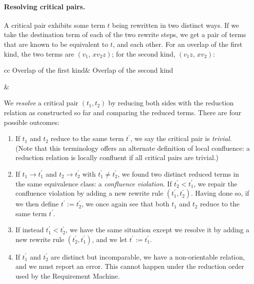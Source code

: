\documentclass[../generics]{subfiles}
\begin{document}
\paragraph{Resolving critical pairs.} 
A critical pair exhibits some term $t$ being rewritten in two distinct ways. If we take the destination term of each of the two rewrite steps, we get a pair of terms that are known to be equivalent to $t$, and each other. For an overlap of the first kind, the two terms are $(v_1,\,xv_2z)$; for the second kind, $(v_1z,\,xv_2)$:
\begin{center}
\begin{tabular}{cc}
Overlap of the first kind&
Overlap of the second kind\\
&
\end{tabular}
\end{center}
 We \emph{resolve} a critical pair $(t_1,t_2)$ by reducing both sides with the reduction relation as constructed so far and comparing the reduced terms. There are four possible outcomes:
\begin{enumerate}
\item If $t_1$ and $t_2$ reduce to the same term $t^\prime$, we say the critical pair is \emph{trivial}. (Note that this terminology offers an alternate definition of local confluence: a reduction relation is locally confluent if all critical pairs are trivial.)
\item If $t_1\rightarrow t_1^\prime$ and $t_2\rightarrow t_2^\prime$ with $t_1^\prime\neq t_2^\prime$, we found two distinct reduced terms in the same equivalence class: a \emph{confluence violation}. If $t_2^\prime < t_1^\prime$, we repair the confluence violation by adding a new rewrite rule $(t_1^\prime, t_2^\prime)$. Having done so, if we then define $t^\prime:=t_2^\prime$, we once again see that both $t_1$ and $t_2$ reduce to the same term $t^\prime$.

\item If instead $t_1^\prime<t_2^\prime$, we have the same situation except we resolve it by adding a new rewrite rule $(t_2^\prime, t_1^\prime)$, and we let $t^\prime:=t_1^\prime$.

\item If $t_1^\prime$ and $t_2^\prime$ are distinct but incomparable, we have a non-orientable relation, and we must report an error. This cannot happen under the reduction order used by the Requirement Machine.
\end{enumerate}
\end{document}
